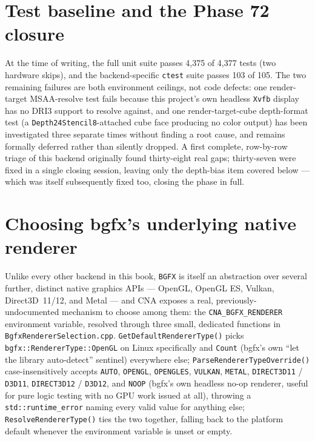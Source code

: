\section{Test baseline and the Phase 72 closure}

At the time of writing, the full unit suite passes 4{,}375 of 4{,}377 tests (two hardware
skips), and the backend-specific \texttt{ctest} suite passes 103 of 105. The two remaining
failures are both environment ceilings, not code defects: one render-target MSAA-resolve test
fails because this project's own headless \texttt{Xvfb} display has no DRI3 support to
resolve against, and one render-target-cube depth-format test (a
\texttt{Depth24Stencil8}-attached cube face producing no color output) has been investigated
three separate times without finding a root cause, and remains formally deferred rather than
silently dropped. A first complete, row-by-row triage of this backend originally found
thirty-eight real gaps; thirty-seven were fixed in a single closing session, leaving only the
depth-bias item covered below --- which was itself subsequently fixed too, closing the phase
in full.

\section{Choosing bgfx's underlying native renderer}
\label{sec:bgfx-renderer-selection}

Unlike every other backend in this book, \texttt{BGFX} is itself an abstraction over several
further, distinct native graphics APIs --- OpenGL, OpenGL ES, Vulkan, Direct3D~11/12, and
Metal --- and CNA exposes a real, previously-undocumented mechanism to choose among them: the
\texttt{CNA\_BGFX\_RENDERER} environment variable, resolved through three small, dedicated
functions in \texttt{BgfxRendererSelection.cpp}. \texttt{GetDefaultRendererType()} picks
\texttt{bgfx::RendererType::OpenGL} on Linux specifically and \texttt{Count} (bgfx's own
``let the library auto-detect'' sentinel) everywhere else; \texttt{ParseRendererTypeOverride()}
case-insensitively accepts \texttt{AUTO}, \texttt{OPENGL}, \texttt{OPENGLES}, \texttt{VULKAN},
\texttt{METAL}, \texttt{DIRECT3D11} / \texttt{D3D11}, \texttt{DIRECT3D12} / \texttt{D3D12}, and
\texttt{NOOP} (bgfx's own headless no-op renderer, useful for pure logic testing with no GPU
work issued at all), throwing a \texttt{std::runtime\_error} naming every valid value for
anything else; \texttt{ResolveRendererType()} ties the two together, falling back to the
platform default whenever the environment variable is unset or empty.

